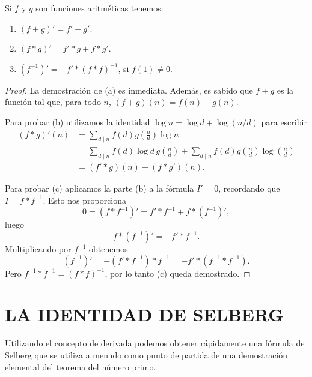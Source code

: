 \documentclass[12pt,a4paper]{book}
\begin{document}
    \begin{teorema}
        Si $f$ y $g$ son funciones aritméticas tenemos:
        \begin{enumerate}
            \item[(a)] $(f+g)'=f'+g'$.
            \item[(b)] $(f*g)'=f'*g+f*g'$.
            \item[(c)] $(f^{-1})'=-f'*(f*f)^{-1}$, si $f(1)\neq0$.
        \end{enumerate}
    \end{teorema}

    \begin{proof}
        La demostración de (a) es inmediata. Además, es sabido que $f+g$ es la función tal
        que, para todo $n$, $(f+g)(n)=f(n)+g(n)$.

        Para probar (b) utilizamos la identidad $\log n=\log d+\log(n/d)$ para escribir
        \begin{align*}
            (f*g)'(n)&=\sum_{d\mid n}f(d)g\left(\frac{n}{d}\right)\log n\\
            &=\sum_{d\mid n}f(d)\log d\,g\left(\frac{n}{d}\right)
            +\sum_{d\mid n}f(d)g\left(\frac{n}{d}\right)\log\left(\frac{n}{d}\right)\\
            &=(f'*g)(n)+(f*g')(n).
        \end{align*}

        Para probar (c) aplicamos la parte (b) a la fórmula $I'=0$, recordando que
        $I=f*f^{-1}$. Esto nos proporciona
        \begin{equation*}
            0=(f*f^{-1})'=f'*f^{-1}+f*(f^{-1})',
        \end{equation*}
        luego
        \begin{equation*}
            f*(f^{-1})'=-f'*f^{-1}.
        \end{equation*}
        Multiplicando por $f^{-1}$ obtenemos
        \begin{equation*}
            (f^{-1})'=-(f'*f^{-1})*f^{-1}=-f'*(f^{-1}*f^{-1}).
        \end{equation*}
        Pero $f^{-1}*f^{-1}=(f*f)^{-1}$, por lo tanto (c) queda demostrado.
    \end{proof}

    \section{LA IDENTIDAD DE SELBERG}

    Utilizando el concepto de derivada podemos obtener rápidamente una fórmula de Selberg
    que se utiliza a menudo como punto de partida de una demostración elemental del
    teorema del número primo.
\end{document}
